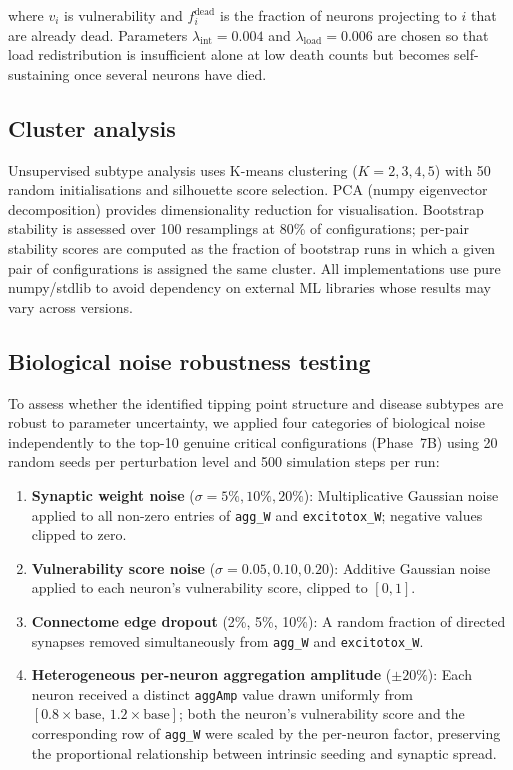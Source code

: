 \documentclass[12pt,a4paper]{article}
\begin{document}
where $v_i$ is vulnerability and $f_i^{\text{dead}}$ is the fraction of neurons projecting to
$i$ that are already dead. Parameters $\lambda_{\text{int}} = 0.004$ and $\lambda_{\text{load}}
= 0.006$ are chosen so that load redistribution is insufficient alone at low death counts but
becomes self-sustaining once several neurons have died.

\subsection{Cluster analysis}

Unsupervised subtype analysis uses K-means clustering ($K = 2, 3, 4, 5$) with 50 random
initialisations and silhouette score selection. PCA (numpy eigenvector decomposition) provides
dimensionality reduction for visualisation. Bootstrap stability is assessed over 100
resamplings at 80\% of configurations; per-pair stability scores are computed as the fraction
of bootstrap runs in which a given pair of configurations is assigned the same cluster. All
implementations use pure numpy/stdlib to avoid dependency on external ML libraries whose
results may vary across versions.

\subsection{Biological noise robustness testing}

To assess whether the identified tipping point structure and disease subtypes are robust to
parameter uncertainty, we applied four categories of biological noise independently to the
top-10 genuine critical configurations (Phase~7B) using 20 random seeds per perturbation level
and 500 simulation steps per run:

\begin{enumerate}
\item \textbf{Synaptic weight noise} ($\sigma = 5\%, 10\%, 20\%$): Multiplicative Gaussian
noise applied to all non-zero entries of \texttt{agg\_W} and \texttt{excitotox\_W}; negative
values clipped to zero.
\item \textbf{Vulnerability score noise} ($\sigma = 0.05, 0.10, 0.20$): Additive Gaussian
noise applied to each neuron's vulnerability score, clipped to $[0, 1]$.
\item \textbf{Connectome edge dropout} (2\%, 5\%, 10\%): A random fraction of directed
synapses removed simultaneously from \texttt{agg\_W} and \texttt{excitotox\_W}.
\item \textbf{Heterogeneous per-neuron aggregation amplitude} ($\pm 20\%$): Each neuron
received a distinct \texttt{aggAmp} value drawn uniformly from $[0.8 \times \text{base},\,
1.2 \times \text{base}]$; both the neuron's vulnerability score and the corresponding row of
\texttt{agg\_W} were scaled by the per-neuron factor, preserving the proportional relationship
between intrinsic seeding and synaptic spread.
\end{enumerate}
\end{document}
